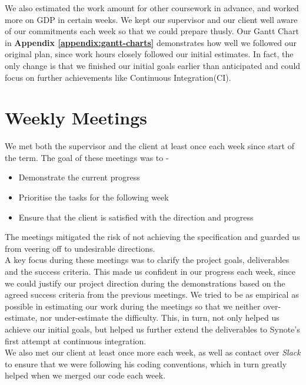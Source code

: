 We also estimated the work amount for other coursework in advance, and worked more on GDP in certain weeks. We kept our supervisor and our client well aware of our commitments each week so that we could prepare thusly. Our Gantt Chart in \textbf{Appendix \ref{appendix:gantt-charts}} demonstrates how well we followed our original plan, since work hours closely followed our initial estimates. In fact, the only change is that we finished our initial goals earlier than anticipated and could focus on further achievements like Continuous Integration(CI).

\section{Weekly Meetings}
\label{sec:weekly-meetings}
We met both the supervisor and the client at least once each week since start of the term. The goal of these meetings was to -

\begin{itemize}

  \item Demonstrate the current progress
  \item Prioritise the tasks for the following week
  \item Ensure that the client is satisfied with the direction and progress

\end{itemize}

The meetings mitigated the risk of not achieving the specification and guarded us from veering off to undesirable directions.\\

A key focus during these meetings was to clarify the project goals, deliverables and the success criteria. This made us confident in our progress each week, since we could justify our project direction during the demonstrations based on the agreed success criteria from the previous meetings. We tried to be as empirical as possible in estimating our work during the meetings so that we neither over-estimate, nor under-estimate the difficulty. This, in turn, not only helped us achieve our initial goals, but helped us further extend the deliverables to Synote's first attempt at continuous integration. \\

We also met our client at least once more each week, as well as contact over \textit{Slack} to ensure that we were following his coding conventions, which in turn greatly helped when we merged our code each week.

